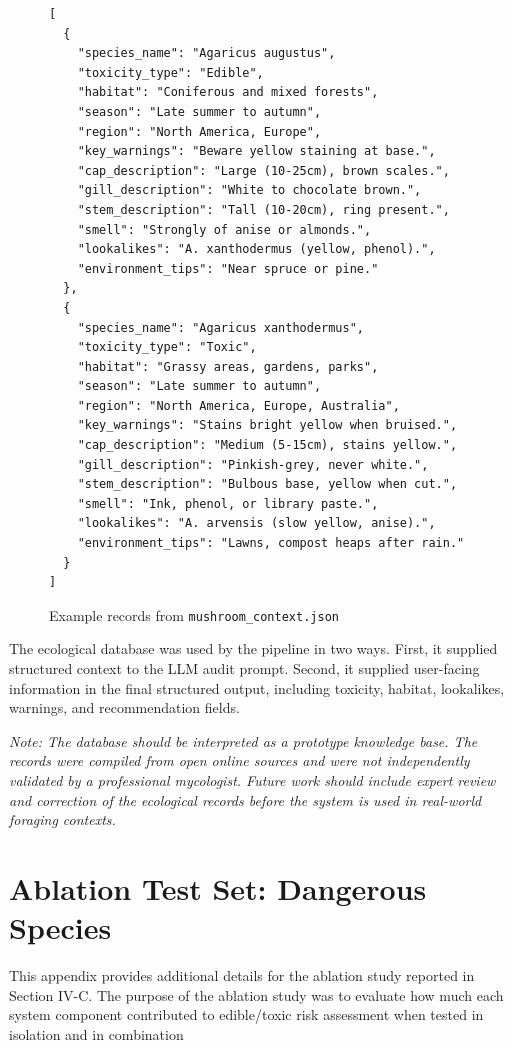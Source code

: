 \documentclass[journal,transmag]{IEEEtran}
\begin{document}
\begin{figure}[h]
\footnotesize
\begin{verbatim}
[
  {
    "species_name": "Agaricus augustus",
    "toxicity_type": "Edible",
    "habitat": "Coniferous and mixed forests",
    "season": "Late summer to autumn",
    "region": "North America, Europe",
    "key_warnings": "Beware yellow staining at base.",
    "cap_description": "Large (10-25cm), brown scales.",
    "gill_description": "White to chocolate brown.",
    "stem_description": "Tall (10-20cm), ring present.",
    "smell": "Strongly of anise or almonds.",
    "lookalikes": "A. xanthodermus (yellow, phenol).",
    "environment_tips": "Near spruce or pine."
  },
  {
    "species_name": "Agaricus xanthodermus",
    "toxicity_type": "Toxic",
    "habitat": "Grassy areas, gardens, parks",
    "season": "Late summer to autumn",
    "region": "North America, Europe, Australia",
    "key_warnings": "Stains bright yellow when bruised.",
    "cap_description": "Medium (5-15cm), stains yellow.",
    "gill_description": "Pinkish-grey, never white.",
    "stem_description": "Bulbous base, yellow when cut.",
    "smell": "Ink, phenol, or library paste.",
    "lookalikes": "A. arvensis (slow yellow, anise).",
    "environment_tips": "Lawns, compost heaps after rain."
  }
]
\end{verbatim}
\caption{Example records from \texttt{mushroom\_context.json}}
\label{fig:eco-example}
\end{figure}

The ecological database was used by the pipeline in two ways. First, it supplied structured context to the LLM audit prompt. Second, it supplied user-facing information in the final structured output, including toxicity, habitat, lookalikes, warnings, and recommendation fields.

\textit{Note: The database should be interpreted as a prototype knowledge base. The records were compiled from open online sources and were not independently validated by a professional mycologist. Future work should include expert review and correction of the ecological records before the system is used in real-world foraging contexts.}

 

\section{\textbf{Ablation Test Set: Dangerous Species}}
This appendix provides additional details for the ablation study reported in Section IV-C. The purpose of the ablation study was to evaluate how much each system component contributed to edible/toxic risk assessment when tested in isolation and in combination
\end{document}
